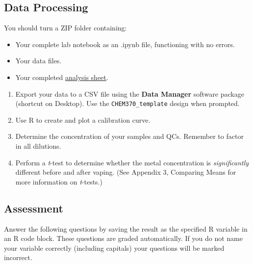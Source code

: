 \documentclass[]{tufte-book}
\providecommand{\tightlist}{%
  \setlength{\itemsep}{0pt}\setlength{\parskip}{0pt}}
\begin{document}
\hypertarget{data-processing-2}{%
\subsection{Data Processing}\label{data-processing-2}}

\begin{marginfigure}
You should turn a ZIP folder containing:

\begin{itemize}
\tightlist
\item
  Your complete lab notebook as an .ipynb file, functioning with no
  errors.\\
\item
  Your data files.\\
\item
  Your completed
  \href{https://github.com/alphonse/alphonse.github.io/raw/master/chem370/assignments/excel-templates/rotation_faas_data-analysis.xlsx}{analysis
  sheet}.
\end{itemize}
\end{marginfigure}

\begin{enumerate}
\def\labelenumi{\arabic{enumi}.}
\tightlist
\item
  Export your data to a CSV file using the \textbf{Data Manager} software package (shortcut on Desktop). Use the \texttt{CHEM370\_template} design when prompted.
\item
  Use R to create and plot a calibration curve.
\item
  Determine the concentration of your samples and QCs. Remember to factor in all dilutions.
\item
  Perform a \emph{t}-test to determine whether the metal concentration is \emph{significantly} different before and after vaping. (See Appendix 3, Comparing Means for more information on \emph{t}-tests.)
\end{enumerate}

\hypertarget{vape-faas-assessment}{%
\subsection{Assessment}\label{vape-faas-assessment}}

Answer the following questions by saving the result as the specified R variable in an R code block. These questions are graded automatically. If you do not name your variable correctly (including capitals) your questions will be marked incorrect.
\end{document}
